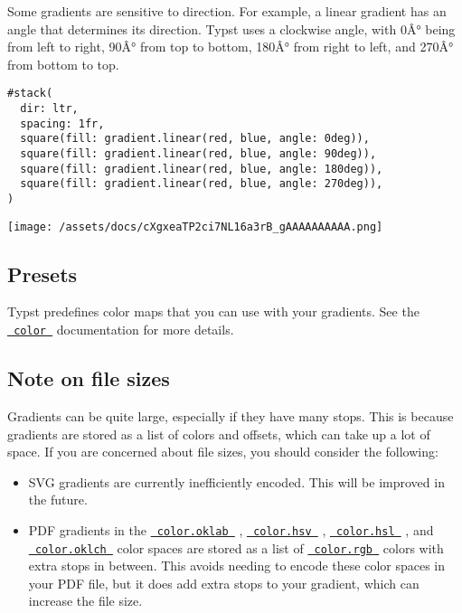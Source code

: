 Some gradients are sensitive to direction. For example, a linear
gradient has an angle that determines its direction. Typst uses a
clockwise angle, with 0Â° being from left to right, 90Â° from top to
bottom, 180Â° from right to left, and 270Â° from bottom to top.

\begin{verbatim}
#stack(
  dir: ltr,
  spacing: 1fr,
  square(fill: gradient.linear(red, blue, angle: 0deg)),
  square(fill: gradient.linear(red, blue, angle: 90deg)),
  square(fill: gradient.linear(red, blue, angle: 180deg)),
  square(fill: gradient.linear(red, blue, angle: 270deg)),
)
\end{verbatim}

\texttt{[image: /assets/docs/cXgxeaTP2ci7NL16a3rB\_gAAAAAAAAAA.png]}

\subsection{Presets}\label{presets}

Typst predefines color maps that you can use with your gradients. See
the
\href{/docs/reference/visualize/color/\#predefined-color-maps}{\texttt{\ color\ }}
documentation for more details.

\subsection{Note on file sizes}\label{note-on-file-sizes}

Gradients can be quite large, especially if they have many stops. This
is because gradients are stored as a list of colors and offsets, which
can take up a lot of space. If you are concerned about file sizes, you
should consider the following:

\begin{itemize}
\tightlist
\item
  SVG gradients are currently inefficiently encoded. This will be
  improved in the future.
\item
  PDF gradients in the
  \href{/docs/reference/visualize/color/\#definitions-oklab}{\texttt{\ color.oklab\ }}
  ,
  \href{/docs/reference/visualize/color/\#definitions-hsv}{\texttt{\ color.hsv\ }}
  ,
  \href{/docs/reference/visualize/color/\#definitions-hsl}{\texttt{\ color.hsl\ }}
  , and
  \href{/docs/reference/visualize/color/\#definitions-oklch}{\texttt{\ color.oklch\ }}
  color spaces are stored as a list of
  \href{/docs/reference/visualize/color/\#definitions-rgb}{\texttt{\ color.rgb\ }}
  colors with extra stops in between. This avoids needing to encode
  these color spaces in your PDF file, but it does add extra stops to
  your gradient, which can increase the file size.
\end{itemize}

